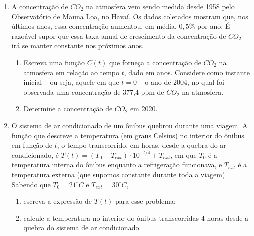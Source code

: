 \begin{enumerate}
	\item A concentração de $ CO_2 $ na atmosfera vem sendo medida desde 1958 pelo Observatório de Mauna Loa, no Havaí. Os dados coletados mostram que, nos últimos anos, essa concentração aumentou, em média, $ 0{,}5\% $ por ano. É razoável supor que essa taxa anual de crescimento da concentração de $ CO_2 $ irá se manter constante nos próximos anos.
	\begin{enumerate}
		\item Escreva uma função $ C(t) $ que forneça a concentração de $ CO_2 $ na atmosfera em relação ao tempo $ t $, dado em anos. Considere como instante inicial -- ou seja, aquele em que $ t = 0 $ -- o ano de 2004, no qual foi observada uma concentração de 377,4 ppm de $ CO_2 $ na atmosfera.
		\item Determine a concentração de $ CO_2 $ em 2020.
	\end{enumerate}

\item O sistema de ar condicionado de um ônibus quebrou durante uma viagem. A função que descreve a temperatura (em graus Celsius) no interior do ônibus em função de $ t $, o tempo transcorrido, em horas, desde a quebra do ar condicionado, é $ T(t) = (T_0 - T_{ext}) \cdot 10^{-t/4} + T_{ext}$, em que $ T_0 $ é a temperatura interna do ônibus enquanto a refrigeração funcionava, e $ T_{ext} $ é a temperatura externa (que supomos constante durante toda a viagem). Sabendo que $ T_0 = 21^\circ C $ e $ T_{ext} = 30^\circ C $,
\begin{enumerate}
	\item escreva a expressão de $ T(t) $ para esse problema;
	\item calcule a temperatura no interior do ônibus transcorridas 4 horas desde a quebra do sistema de ar condicionado.
\end{enumerate} 
\end{enumerate}


\ifnum{}
\clearpage
\else
\notasfinais
\fi




\nocite{*}








